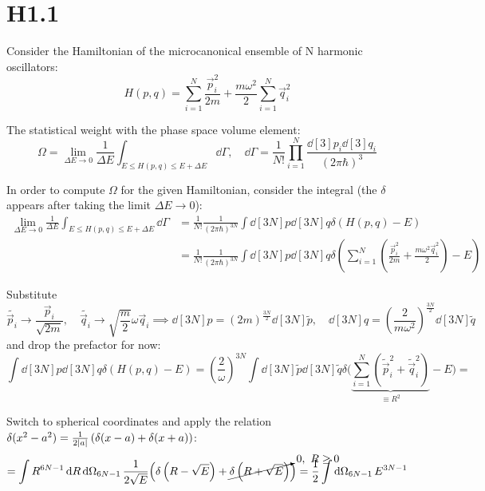 \documentclass[11pt,a4paper]{scrartcl}
\begin{document}
\section*{H1.1}

Consider the Hamiltonian of the microcanonical ensemble of N harmonic oscillators:
\begin{equation*}
    H(p, q) = \sum_{i=1}^{N}\frac{\vec{p}_i^2}{2m} +
    \frac{m\omega^2}{2}\sum_{i=1}^{N}\vec{q}_i^2
\end{equation*}

The statistical weight with the phase space volume element:
\begin{equation*}
    \Omega = \lim_{\Delta E \to 0}\frac{1}{\Delta E} \int_{E\leq H(p,q)\leq
    E+\Delta E}\dd\Gamma, \quad
    \dd\Gamma = \frac{1}{N!}\prod_{i=1}^{N}\frac{\dd[3]p_i\dd[3]q_i}{(2\pi\hbar)^{3}}
\end{equation*}

In order to compute $\Omega$ for the given Hamiltonian, consider the
integral (the $\delta$ appears after taking the limit $\Delta E \to 0$):
\begin{align*}
    \lim_{\Delta E \to 0}\frac{1}{\Delta E}\int_{E\leq H(p,q)\leq E+\Delta E}\dd\Gamma &=
    \frac{1}{N!}\frac{1}{(2\pi\hbar)^{3N}}\int\dd[3N]{p}\dd[3N]{q}
    \delta\left(H(p,q)-E\right) \\
    &= \frac{1}{N!}\frac{1}{(2\pi\hbar)^{3N}}\int\dd[3N]{p}\dd[3N]{q}
    \delta\left(\sum_{i=1}^{N}\left(\frac{\vec{p}_i^2}{2m}+\frac{m\omega^2\vec{q}_i^2}{2}\right)-E\right)
\end{align*}

Substitute
\begin{equation*}
    \widetilde{\vec{p}_i}\longrightarrow\frac{\vec{p}_i}{\sqrt{2m}}, \quad
    \widetilde{\vec{q}_i}\longrightarrow\sqrt{\frac{m}{2}}\omega\vec{q}_i
    \implies \dd[3N]{p} = \left(2m\right)^{\frac{3N}{2}}\dd[3N]{\widetilde{p}},
    \quad \dd[3N]{q} = \left(\frac{2}{m\omega^2}\right)^{\frac{3N}{2}}\dd[3N]{\widetilde{q}}
\end{equation*}
and drop the prefactor for now:
\begin{equation*}
    \int\dd[3N]{p}\dd[3N]{q}\delta\left(H(p,q)-E\right) =
    \left(\frac{2}{\omega}\right)^{3N}
    \int\dd[3N]{\widetilde{p}}\dd[3N]{\widetilde{q}}
    \delta\Bigg(
    \underbrace{\sum_{i=1}^{N}\left(\widetilde{\vec{p}}_i^2+\widetilde{\vec{q}}_i^2\right)}_{\equiv R^2}
    -E\Bigg) =
\end{equation*}

Switch to spherical coordinates and apply the relation
$\delta(x^2-a^2)=\frac{1}{2\abs{a}}\left(\delta(x-a)+\delta(x+a)\right)$:
\begin{equation*}
    = \int R^{6N-1}\dd{R}\dd{\Omega_{6N-1}}\frac{1}{2\sqrt{E}}\Big(\delta\left(R-\sqrt{E}\right)
    +\cancelto{0,\ R\geq 0}{\delta\left(R+\sqrt{E}\right)}\Big)
    = \frac{1}{2}\int\dd{\Omega_{6N-1}}E^{3N-1}
\end{equation*}
\end{document}
